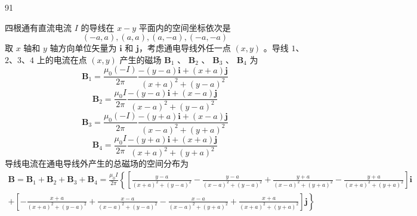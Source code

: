 \begin{solution}{91}
\begin{subsolution}
四根通有直流电流 $I$ 的导线在 $x-y$ 平面内的空间坐标依次是
\begin{equation}
(- a, a), (a, a), (a, - a), (- a, - a)
\label{eq:1.s91}
\end{equation}
取 $x$ 轴和 $y$ 轴方向单位矢量为 $\boldsymbol{i}$ 和 $\boldsymbol{j}$，考虑通电导线外任一点 $(x, y)$ 。导线 $1$、$2$、$3$、$4$ 上的电流在点 $(x, y)$ 产生的磁场 $\boldsymbol{B}_{1}$ 、 $\boldsymbol{B}_{2}$ 、 $\boldsymbol{B}_{3}$ 、 $\boldsymbol{B}_{4}$ 为
\begin{equation}
\boldsymbol {B} _ {1} = \frac {\mu_ {0} (- I)}{2 \pi} \frac {- (y - a) \boldsymbol {i} + (x + a) \boldsymbol {j}}{(x + a) ^ {2} + (y - a) ^ {2}}
\label{eq:2.s91}
\end{equation}
\begin{equation}
\boldsymbol {B} _ {2} = \frac {\mu_ {0} I}{2 \pi} \frac {- (y - a) \boldsymbol {i} + (x - a) \boldsymbol {j}}{(x - a) ^ {2} + (y - a) ^ {2}}
\label{eq:3.s91}
\end{equation}
\begin{equation}
\boldsymbol {B} _ {3} = \frac {\mu_ {0} (- I)}{2 \pi} \frac {- (y + a) \boldsymbol {i} + (x - a) \boldsymbol {j}}{(x - a) ^ {2} + (y + a) ^ {2}}
\label{eq:4.s91}
\end{equation}
\begin{equation}
\boldsymbol {B} _ {4} = \frac {\mu_ {0} I}{2 \pi} \frac {- (y + a) \boldsymbol {i} + (x + a) \boldsymbol {j}}{(x + a) ^ {2} + (y + a) ^ {2}}
\label{eq:5.s91}
\end{equation}
导线电流在通电导线外产生的总磁场的空间分布为
\begin{equation}
\begin{aligned} \boldsymbol {B} = \boldsymbol {B} _ {1} + \boldsymbol {B} _ {2} + \boldsymbol {B} _ {3} + \boldsymbol {B} _ {4} = \frac {\mu_ {0} I}{2 \pi} \left\{\left[ \frac {y - a}{(x + a) ^ {2} + (y - a) ^ {2}} - \frac {y - a}{(x - a) ^ {2} + (y - a) ^ {2}} + \frac {y + a}{(x - a) ^ {2} + (y + a) ^ {2}} - \frac {y + a}{(x + a) ^ {2} + (y + a) ^ {2}} \right] \boldsymbol{i} \right. \\ \left. + \left[ - \frac {x + a}{(x + a) ^ {2} + (y - a) ^ {2}} + \frac {x - a}{(x - a) ^ {2} + (y - a) ^ {2}} - \frac {x - a}{(x - a) ^ {2} + (y + a) ^ {2}} + \frac {x + a}{(x + a) ^ {2} + (y + a) ^ {2}} \right] \boldsymbol{j} \right\} \end{aligned}
\label{eq:6.s91}
\end{equation}

\end{subsolution}
\end{solution}
